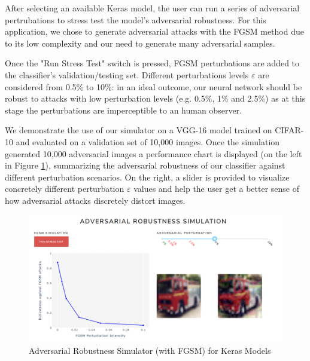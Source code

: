 After selecting an available Keras model, the user can run a series of adversarial pertrubations to stress test the model's adversarial robustness. For this application, we chose to generate adversarial attacks with the FGSM method due to its low complexity and our need to generate many adversarial samples.

Once the "Run Stress Test" switch is pressed, FGSM perturbations are added to the classifier's validation/testing set. Different perturbations levels $\varepsilon$ are considered from 0.5\% to 10\%: in an ideal outcome, our neural network should be robust to attacks with low perturbation levels (e.g. 0.5\%, 1\% and 2.5\%) as at this stage the perturbations are imperceptible to an human observer.

We demonstrate the use of our simulator on a VGG-16 model trained on CIFAR-10 and evaluated on a validation set of 10,000 images. Once the simulation generated 10,000 adversarial images a performance chart is displayed (on the left in Figure \ref{fig:Adv_007_Fig}), summarizing the adversarial robustness of our classifier against different perturbation scenarios. On the right, a slider is provided to visualize concretely different perturbation $\varepsilon$ values and help the user get a better sense of how adversarial attacks discretely distort images.


\vspace{0.2cm}

\begin{figure}[H]
	\centering
	\includegraphics[scale=0.65]{images/adversarial_attacks/Adv_Fig_007_Simulator.PNG}
	\caption{Adversarial Robustness Simulator (with FGSM) for Keras Models}
	\label{fig:Adv_007_Fig}
\end{figure}

\vspace{0.2cm}



\newpage